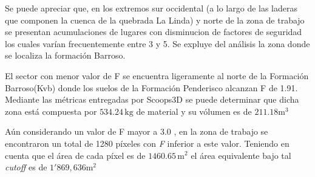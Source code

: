 Se puede apreciar que, en los extremos sur occidental (a lo largo de las laderas que componen la cuenca de la quebrada La Linda) y norte de la zona de trabajo se presentan acumulaciones de lugares con disminucion de factores de seguridad los cuales var\'ian frecuentemente entre 3 y 5. Se expluye del an\'alisis la zona donde se localiza la formaci\'on Barroso.

El sector con menor valor de F se encuentra ligeramente al norte de la Formaci\'on Barroso(Kvb) donde los suelos de la Formaci\'on Penderisco alcanzan F de 1.91.  Mediante las m\'etricas entregadas por Scoops3D se puede determinar que dicha zona est\'a compuesta por  $534.24\,\text{kg}$ de material y su v\'olumen es de $211.18\text{m}^{3}$


A\'un considerando un valor de F mayor a 3.0 , en la zona de trabajo se encontraron un total de 1280 p\'ixeles con \textit{F} inferior a este valor. Teniendo en cuenta que el \'area de cada p\'ixel es de  $1460.65\,\text{m}^{2}$ el \'area  equivalente bajo tal \textit{cutoff} es de $1'869,636 \text{m}^{2}$


